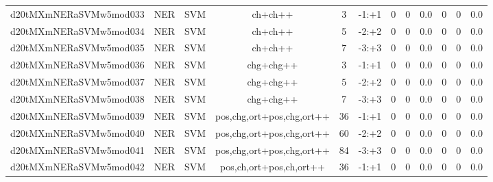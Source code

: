 \documentclass[a4paper]{article}
\begin{document}
\begin{landscape}
\begin{center}
\begin{tabular}{ |c|c|c|c|c|c|c|c|c|c|c|c|}
 
 	
 	\small{ d20tMXmNERaSVMw5mod033 } & \small{ NER} & \small{  SVM }  & ch+ch++  &  3 &  \small{  -1:+1 }  &  0 & 0 & 0.0  &  0 & 0 & 0.0 \\
 	

 
 	
 	\small{ d20tMXmNERaSVMw5mod034 } & \small{ NER} & \small{  SVM }  & ch+ch++  &  5 &  \small{  -2:+2 }  &  0 & 0 & 0.0  &  0 & 0 & 0.0 \\
 	

 
 	
 	\small{ d20tMXmNERaSVMw5mod035 } & \small{ NER} & \small{  SVM }  & ch+ch++  &  7 &  \small{  -3:+3 }  &  0 & 0 & 0.0  &  0 & 0 & 0.0 \\
 	

 
 	
 	\small{ d20tMXmNERaSVMw5mod036 } & \small{ NER} & \small{  SVM }  & chg+chg++  &  3 &  \small{  -1:+1 }  &  0 & 0 & 0.0  &  0 & 0 & 0.0 \\
 	

 
 	
 	\small{ d20tMXmNERaSVMw5mod037 } & \small{ NER} & \small{  SVM }  & chg+chg++  &  5 &  \small{  -2:+2 }  &  0 & 0 & 0.0  &  0 & 0 & 0.0 \\
 	

 
 	
 	\small{ d20tMXmNERaSVMw5mod038 } & \small{ NER} & \small{  SVM }  & chg+chg++  &  7 &  \small{  -3:+3 }  &  0 & 0 & 0.0  &  0 & 0 & 0.0 \\
 	

 
 	
 	\small{ d20tMXmNERaSVMw5mod039 } & \small{ NER} & \small{  SVM }  & pos,chg,ort+pos,chg,ort++  &  36 &  \small{  -1:+1 }  &  0 & 0 & 0.0  &  0 & 0 & 0.0 \\
 	

 
 	
 	\small{ d20tMXmNERaSVMw5mod040 } & \small{ NER} & \small{  SVM }  & pos,chg,ort+pos,chg,ort++  &  60 &  \small{  -2:+2 }  &  0 & 0 & 0.0  &  0 & 0 & 0.0 \\
 	

 
 	
 	\small{ d20tMXmNERaSVMw5mod041 } & \small{ NER} & \small{  SVM }  & pos,chg,ort+pos,chg,ort++  &  84 &  \small{  -3:+3 }  &  0 & 0 & 0.0  &  0 & 0 & 0.0 \\
 	

 
 	
 	\small{ d20tMXmNERaSVMw5mod042 } & \small{ NER} & \small{  SVM }  & pos,ch,ort+pos,ch,ort++  &  36 &  \small{  -1:+1 }  &  0 & 0 & 0.0  &  0 & 0 & 0.0 \\
 	

\end{tabular}
\end{center}
\end{landscape}
\end{document}
